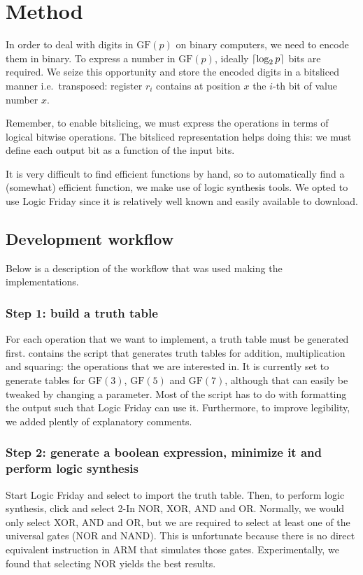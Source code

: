 \documentclass{report}
\DeclarePairedDelimiter\ceil{\lceil}{\rceil}
\newcommand{\GF}{\text{GF}}
\begin{document}
\section{Method}
In order to deal with digits in $\GF(p)$ on binary computers, we need to encode them in binary. 
To express a number in $\GF(p)$, ideally $\ceil*{\log_2 p}$ bits are required. We seize this opportunity and store the encoded digits in a bitsliced manner i.e.\ transposed: register $r_i$ contains at position $x$ the $i$-th bit of value number $x$.

Remember, to enable bitslicing, we must express the operations in terms of logical bitwise operations. The bitsliced representation helps doing this: we must define each output bit as a function of the input bits.

It is very difficult to find efficient functions by hand, so to automatically find a (somewhat) efficient function, we make use of logic synthesis tools. We opted to use Logic Friday since it is relatively well known and easily available to download.

\subsection{Development workflow}
Below is a description of the workflow that was used making the implementations.

\subsubsection*{Step 1: build a truth table}
For each operation that we want to implement, a truth table must be generated first.  contains the script that generates truth tables for addition, multiplication and squaring: the operations that we are interested in. It is currently set to generate tables for $\GF(3)$, $\GF(5)$ and $\GF(7)$, although that can easily be tweaked by changing a parameter. Most of the script has to do with formatting the output such that Logic Friday can use it. Furthermore, to improve legibility, we added plently of explanatory comments.

\subsubsection*{Step 2: generate a boolean expression, minimize it and perform logic synthesis}
Start Logic Friday and select  to import the truth table. Then, to perform logic synthesis, click  and select 2-In NOR, XOR, AND and OR.
Normally, we would only select XOR, AND and OR, but we are required to select at least one of the universal gates (NOR and NAND). This is unfortunate because there is no direct equivalent instruction in ARM that simulates those gates. Experimentally, we found that selecting NOR yields the best results. 
\end{document}
